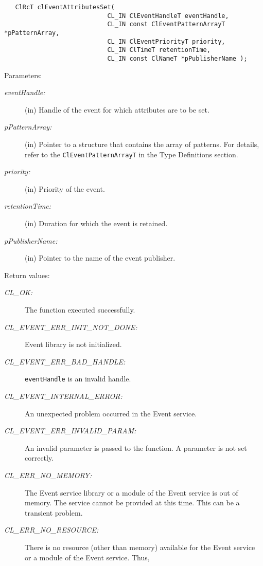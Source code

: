 \begin{flushleft}
\begin{Desc}
\footnotesize\begin{verbatim}   ClRcT clEventAttributesSet(
              				CL_IN ClEventHandleT eventHandle,
              				CL_IN const ClEventPatternArrayT *pPatternArray,
              				CL_IN ClEventPriorityT priority,
              				CL_IN ClTimeT retentionTime,
              				CL_IN const ClNameT *pPublisherName );
\end{verbatim}
\normalsize
\end{Desc}
\begin{Desc}
\item[Parameters:]
\begin{description}
\item[{\em event\-Handle:}](in) Handle of the event for which attributes are to be set.
\item[{\em p\-Pattern\-Array:}](in) Pointer to a structure that contains the array of patterns. For details, refer to the {\tt{ClEventPatternArrayT}} in the
Type Definitions section.
\item[{\em priority:}](in) Priority of the event.
\item[{\em retention\-Time:}](in) Duration for which the event is retained.
\item[{\em p\-Publisher\-Name:}](in) Pointer to the name of the event publisher.
\end{description}
\end{Desc}
\begin{Desc}
\item[Return values:]
\begin{description}
\item[{\em CL\_\-OK:}]The function executed successfully. 
\item[{\em CL\_\-EVENT\_\-ERR\_\-INIT\_\-NOT\_\-DONE:}]Event library is not initialized. 
\item[{\em CL\_\-EVENT\_\-ERR\_\-BAD\_\-HANDLE:}]{\tt{eventHandle}} is an invalid handle.
\item[{\em CL\_\-EVENT\_\-INTERNAL\_\-ERROR:}]An unexpected problem occurred in the Event service. 
\item[{\em CL\_\-EVENT\_\-ERR\_\-INVALID\_\-PARAM:}]An invalid parameter is passed to the function. A parameter is not set correctly.
\item[{\em CL\_\-ERR\_\-NO\_\-MEMORY:}]The Event service library or a module of the Event service is out of memory. The service cannot be 
provided at this time. This can be a transient problem.
\item[{\em CL\_\-ERR\_\-NO\_\-RESOURCE:}]There is no resource (other than memory) available for the Event service or a module of the Event service. Thus, 

\end{description}
\end{Desc}
\end{flushleft}
